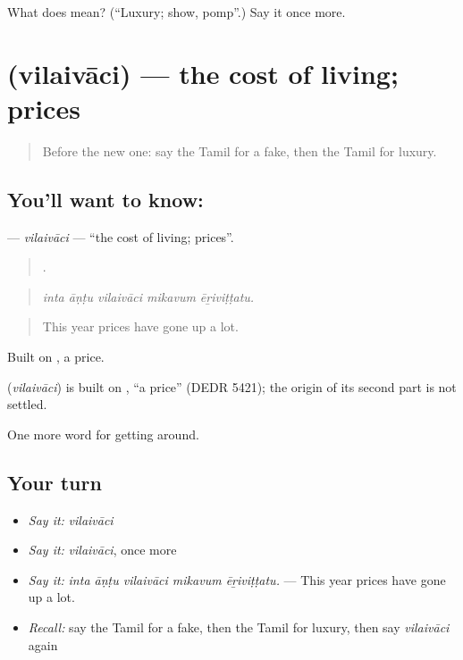 \begin{tcolorbox}[breakable,colback=teal!4,colframe=teal!35!black,title={Before you move on}]
What does  mean? (\textquotedblleft{}Luxury; show, pomp\textquotedblright{}.) Say it once more.
\end{tcolorbox}
\section[\texorpdfstring{\ta{விலைவாசி} (vilaivāci)}{விலைவாசி (vilaivāci)}]{ (vilaivāci) — the cost of living; prices}

\label{lesson:TA-C450-vilaivaci}



\begin{quote}
Before the new one: say the Tamil for a fake, then the Tamil for luxury.
\end{quote}

\subsection*{You'll want to know: }
\textbf{} — \emph{vilaivāci} — \textquotedblleft{}the cost of living; prices\textquotedblright{}.

\begin{quote}
    .
\end{quote}

\begin{quote}
\emph{inta āṇṭu vilaivāci mikavum ēṟiviṭṭatu.}
\end{quote}

\begin{quote}
This year prices have gone up a lot.
\end{quote}

Built on , a price.

\begin{cousinweb}
\textbf{} (\emph{vilaivāci}) is built on , \textquotedblleft{}a price\textquotedblright{} (DEDR 5421); the origin of its second part is not settled.
\end{cousinweb}

\begin{grammarlens}[title={What you've built}]
One more word for getting around.
\end{grammarlens}

\subsection*{Your turn}
\begin{itemize}
\raggedright
  \item \emph{Say it:} \emph{vilaivāci}
  \item \emph{Say it:} \emph{vilaivāci}, once more
  \item \emph{Say it:} \emph{inta āṇṭu vilaivāci mikavum ēṟiviṭṭatu.} — This year prices have gone up a lot.
  \item \emph{Recall:} say the Tamil for a fake, then the Tamil for luxury, then say \emph{vilaivāci} again
\end{itemize}

